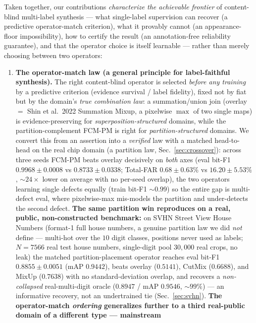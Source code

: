 \documentclass[11pt]{article}
\begin{document}
Taken together, our contributions \emph{characterize the achievable frontier} of
content-blind multi-label synthesis --- what single-label supervision can recover (a
predictive operator-match criterion), what it provably cannot (an appearance-floor
impossibility), how to certify the result (an annotation-free reliability guarantee),
and that the operator choice is itself learnable --- rather than merely choosing between
two operators:
\begin{enumerate}
\item \textbf{The operator-match law (a general principle for label-faithful synthesis).}
  The right content-blind operator is selected \emph{before any training} by a
  predictive criterion (evidence survival / label fidelity), fixed not by fiat but by
  the domain's \emph{true combination law}: a summation/union join (overlay $=$ Shin
  et al.\ 2022 Summation Mixup, a pixelwise $\max$ of two single maps) is
  evidence-preserving for \emph{superposition-structured} domains, while the
  partition-complement FCM-PM is right for \emph{partition-structured} domains. We
  convert this from an assertion into a \emph{verified} law with a matched head-to-head
  on the real chip domain (a partition law, Sec.~\ref{sec:crossover}): across three
  seeds FCM-PM beats overlay decisively on \emph{both} axes (eval bit-F1
  $0.9968 \pm 0.0008$ vs $0.8733 \pm 0.0338$; Total-FAR $0.68 \pm 0.63\%$ vs
  $16.20 \pm 5.53\%$, ${\sim}24\times$ lower on average with no per-seed overlap), the
  two operators learning single defects equally (train bit-F1 ${\sim}0.99$) so the
  entire gap is multi-defect eval, where pixelwise-max mis-models the partition and
  under-detects the second defect. \textbf{The same partition win reproduces on a real,
  public, non-constructed benchmark:} on SVHN Street View House Numbers (format-1 full house
  numbers, a genuine partition law we did \emph{not} define --- multi-hot over the $10$ digit
  classes, positions never used as labels; $N{=}7566$ real test house numbers, single-digit
  pool $30{,}000$ real crops, no leak) the matched partition-placement operator reaches eval
  bit-F1 $0.8855 \pm 0.0051$ (mAP $0.9442$), beats overlay ($0.5141$), CutMix ($0.6688$), and
  MixUp ($0.7638$) with no standard-deviation overlap, and recovers a \emph{non-collapsed}
  real-multi-digit oracle ($0.8947$ / mAP $0.9546$, ${\sim}99\%$) --- an informative recovery,
  not an undertrained tie (Sec.~\ref{sec:svhn}). \textbf{The operator-match \emph{ordering}
  generalizes further to a third real-public domain of a different type --- mainstream
}
\end{enumerate}
\end{document}
